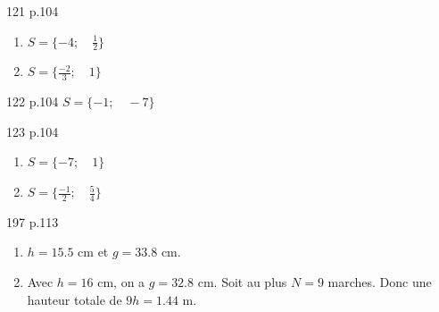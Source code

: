 \documentclass[10pt,a4paper,openany,twoside]{book}
\begin{document}
      \begin{bookexo}{121 p.104}
             \begin{enumerate}[label=\alph*.]
            \item 
            $S=\{-4;\quad \frac{1}{2}\}$
            \item 
            $S=\{\frac{-2}{3};\quad 1\}$
        \end{enumerate}
    \end{bookexo}
    \begin{bookexo}{122 p.104}
            $S=\{-1;\quad -7\}$
    \end{bookexo}
      \begin{bookexo}{123 p.104}
             \begin{enumerate}[label=\alph*.]
            \item 
            $S=\{-7;\quad 1\}$
            \item 
            $S=\{\frac{-1}{2};\quad \frac{5}{4}\}$
        \end{enumerate}
    \end{bookexo}

    \begin{bookexo}{197 p.113}
        \begin{enumerate}
            \item $h=15.5$ cm et $g=33.8$ cm.
            \item Avec $h=16$ cm, on a $g=32.8$ cm. Soit au plus $N=9$ marches. Donc une hauteur totale de $9h=1.44$ m.
        \end{enumerate}
    \end{bookexo}
\end{document}
